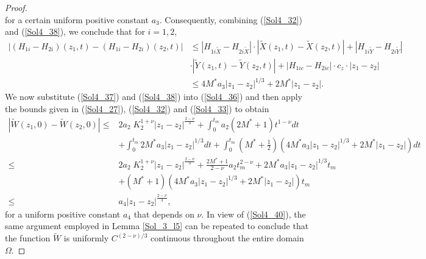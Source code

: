 \documentclass[3p,11pt]{elsarticle}
\numberwithin{equation}{section}
\begin{document}
\begin{proof}
\begin{equation}
     \end{equation}
     for a certain uniform positive constant $a_3$. Consequently, combining (\ref{Sol4_32}) and (\ref{Sol4_38}), we conclude that for $i=1,2$,
     \begin{equation*}\label{Sol4_39}
         \begin{split}
             \left| (H_{1i}-H_{2i})(z_1,t)-(H_{1i}-H_{2i})(z_2,t)\right| &\leq |H_{1i\widetilde X}-H_{2i\widetilde X}|\cdot|\widetilde X(z_1,t)-\widetilde X(z_2,t)|+ |H_{1i\widetilde Y}-H_{2i\widetilde Y}|\\& \cdot|\widetilde Y(z_1,t)-\widetilde Y(z_2,t)|+|H_{1ic}-H_{2ic}|\cdot c_z\cdot |z_1-z_2|\\
             &\leq 4M^*a_3|z_1-z_2|^{1/3}+2M^*|z_1-z_2|.
         \end{split}
     \end{equation*}
     We now substitute (\ref{Sol4_37}) and (\ref{Sol4_38}) into (\ref{Sol4_36}) and then apply the bounds given in  (\ref{Sol4_27}), (\ref{Sol4_32}) and (\ref{Sol4_33}) to obtain
     \begin{equation}\label{Sol4_40}
         \begin{split}
             |\widetilde W(z_1,0)-\widetilde W(z_2,0)|\leq &2a_2 \;K_2^{1+\nu}|z_1-z_2|^\frac{2-\nu}{3}+\int_0^{t_m} a_2(2M^*+1)t^{1-\nu} dt\\
             &+ \int_0^{t_m} 2M^* a_3|z_1-z_2|^{1/3} dt+\int_0^{t_m} \left(M^*+\frac{1}{2}\right)\left(4M^*a_3|z_1-z_2|^{1/3}+2M^*|z_1-z_2|\right)dt\\
             \leq & 2a_2 \;K_2^{1+\nu}|z_1-z_2|^\frac{2-\nu}{3}+\frac{2M^*+1}{2-\nu}a_2t_m^{2-
             \nu}+2M^*a_3|z_1-z_2|^{1/3}t_m\\
             &+ (M^*+1)\left(4M^*a_3|z_1-z_2|^{1/3}+2M^*|z_1-z_2| \right)t_m\\
             \leq & a_4 |z_1-z_2|^{\frac{2-\nu}{3}},
         \end{split}
     \end{equation}
     for a uniform positive constant $a_4$ that depends on $\nu$. In view of (\ref{Sol4_40}), the same argument employed in Lemma \ref{Sol_3_l5} can be repeated to conclude that the function $\widetilde W$ is uniformly $C^{(2-\nu)/3}$ continuous throughout the entire domain $\Omega$.


\end{proof}
\end{document}
